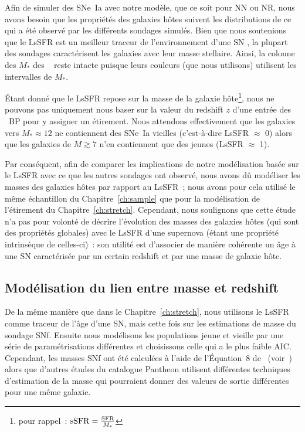 \documentclass[../main/main.tex]{subfiles}
\begin{document}
Afin de simuler des SNe~Ia avec notre modèle, que ce soit pour NN ou NR, nous
avons besoin que les propriétés des galaxies hôtes suivent les distributions de
ce qui a été observé par les différents sondages simulés. Bien que nous
soutenions que le LsSFR est un meilleur traceur de l'environnement d'une SN
\citep{briday2022}, la plupart des sondages caractérisent les galaxies avec leur
masse stellaire. Ainsi, la colonne des $M_*$ des \hostlib\
 reste intacte puisque leurs couleurs (que nous
utilisons) utilisent les intervalles de $M_*$.

Étant donné que le LsSFR repose sur la masse de la galaxie hôte\footnote{pour
rappel~: $\mathrm{sSFR} = \frac{\rm SFR}{M_*}$}, nous ne pouvons pas uniquement
nous baser sur la valeur du redshift $z$ d'une entrée des \hostlib\ BP pour y
assigner un étirement. Nous attendons effectivement que les galaxies vers
$M_*\approx12$ ne contiennent des SNe~Ia vieilles (c'est-à-dire LsSFR $\approx$
0) alors que les galaxies de $M \gtrsim 7$ n'en contiennent que des jeunes
(LsSFR $\approx$ 1).

Par conséquent, afin de comparer les implications de notre modélisation basée
sur le LsSFR avec ce que les autres sondages ont observé, nous avons dû
modéliser les masses des galaxies hôtes par rapport au LsSFR~; nous avons pour
cela utilisé le même échantillon du Chapitre~\ref{ch:sample} que pour la
modélisation de l'étirement du Chapitre~\ref{ch:stretch}. Cependant, nous
soulignons que cette étude n'a pas pour volonté de décrire l'évolution des
masses des galaxies hôtes (qui sont des propriétés globales) avec le LsSFR d'une
supernova (étant une propriété intrinsèque de celles-ci)~: son utilité est
d'associer de manière cohérente un âge à une SN caractérisée par un certain
redshift et par une masse de galaxie hôte.

\subsection{Modélisation du lien entre masse et redshift}\label{ssec:mmod}

De la même manière que dans le Chapitre~\ref{ch:stretch}, nous utilisons le
LsSFR comme traceur de l'âge d'une SN, mais cette fois sur les estimations de
masse du sondage SNf. Ensuite nous modélisons les populations jeune et vieille
par une série de paramétrisations différentes et choisissons celle qui a le plus
faible AIC. Cependant, les masses SNf ont été calculées à l'aide de l'Équation~8
de~\cite{taylor2011} (voir~\cite{rigault2020}) alors que d'autres études du
catalogue Pantheon utilisent différentes techniques d'estimation de la masse qui
pourraient donner des valeurs de sortie différentes pour une même galaxie.
\end{document}
